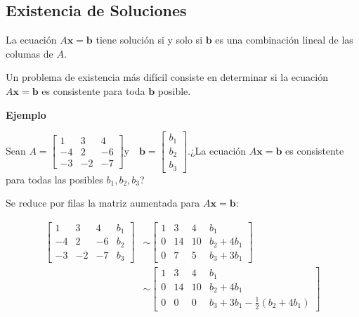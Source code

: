 \documentclass{article}
\begin{document}
\subsection*{Existencia de Soluciones}

\begin{tcolorbox}[colback=blue!10!white,colframe=blue!60!black,title=Solución de Ecuación Matricial]
    La ecuación $A\mathbf{x} = \mathbf{b}$ tiene solución si y solo si $\mathbf{b}$ es una combinación lineal de las columas de $A$.
\end{tcolorbox}

Un problema de existencia más difícil consiste en determinar si la ecuación $A\mathbf{x} = \mathbf{b}$ es consistente para toda $\mathbf{b}$ posible.

\begin{large}
    \textbf{Ejemplo}
\end{large}

Sean $A=\begin{bmatrix}
    1&3&4\\
    -4&2&-6\\
    -3&-2&-7
\end{bmatrix} 
\text{y} \quad \mathbf{b}=\begin{bmatrix} b_1\\b_2\\b_3 \end{bmatrix}$.¿La ecuación $A\mathbf{x} = \mathbf{b}$ es consistente para todas las posibles $b_1, b_2, b_3$?

Se reduce por filas la matriz aumentada para $A\mathbf{x} = \mathbf{b}$:

\begin{equation*}
    \begin{aligned}
    {\left[\begin{array}{rrrr}
    1 & 3 & 4 & b_1 \\
    -4 & 2 & -6 & b_2 \\
    -3 & -2 & -7 & b_3
    \end{array}\right] } & \sim\left[\begin{array}{rrrc}
    1 & 3 & 4 & b_1 \\
    0 & 14 & 10 & b_2+4 b_1 \\
    0 & 7 & 5 & b_3+3 b_1
    \end{array}\right] \\
    & \sim\left[\begin{array}{rrrc}
    1 & 3 & 4 & b_1 \\
    0 & 14 & 10 & b_2+4 b_1 \\
    0 & 0 & 0 & b_3+3 b_1-\frac{1}{2}\left(b_2+4 b_1\right)
    \end{array}\right]
    \end{aligned}
\end{equation*}
\end{document}
